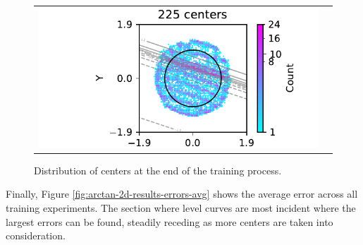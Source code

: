 \documentclass[12pt]{report} %
\begin{document}
\begin{figure}
\begin{tabular}{cc}
    \includegraphics[width=.6\textwidth]{imagenes/experiments/2d/statistical_2d_full_scheduler_interpolation/arctan_2d/circle_c225_arctan_paper_2d_gaussian_kernel.pdf}
  \end{tabular}
  \caption{Distribution of centers at the end of the training process.}
  \label{fig:arctan-2d-results-centers}
\end{figure}

Finally, Figure \ref{fig:arctan-2d-results-errors-avg} shows the average error across all training experiments. The section where level curves are most incident where the largest errors can be found, steadily receding as more centers are taken into consideration.
\end{document}
